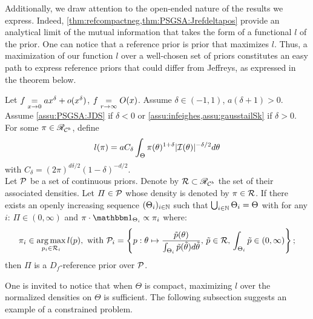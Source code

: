 Additionally, we draw attention to the open-ended nature of the results we express. 
Indeed, \cref{thm:refcompactneg,thm:PSGSA:Jrefdeltapos} provide an analytical limit of the mutual information that takes the form of a functional $l$ of the prior.
One can notice that a reference prior is prior that maximizes $l$.
Thus, a maximization of our function $l$ over a well-chosen set of priors constitutes an easy path to express reference priors that could differ from Jeffreys, as expressed in the theorem below.
\begin{thm}\label{thm:PSGSA:maximizel}
    Let $f\overset{}{\underset{x\rightarrow 0}{=}} a x^\delta+o(x^\delta)$, $f\overset{}{\underset{r\rightarrow\infty}{=}}O(x)$. Assume $\delta\in(-1,1)$, $a(\delta+1)>0$. Assume \cref{assu:PSGSA:JDS} if $\delta<0$ or \cref{assu:infeighes,assu:gausstailSk} if $\delta>0$.
    For some $\pi\in\mathscr{R}_{\mathcal{C}^b}$, define
        \begin{equation}
            l(\pi) = aC_\delta\int_\Theta\pi(\theta)^{1+\delta}|\mathcal{I}(\theta)|^{-\delta/2}d\theta
        \end{equation}
    with $C_\delta=(2\pi)^{d\delta/2}(1-\delta)^{-d/2} $. \\
    Let $\mathcal{P}$ be a set of continuous priors. %
    Denote by $\mathcal{R}\subset\mathscr{R}_{\mathcal{C}^b}$ the set of their associated densities.
    Let $\varPi\in\mathcal{P}$ whose density is denoted by $\pi\in\mathcal{R}$.
    If there exists an openly increasing sequence $(\Theta_i)_{i\in\mathbb{N}}$ such that $\bigcup_{i\in\mathbb{N}}\Theta_i=\Theta$ with for any $i$: $\varPi\in(0,\infty)$ and $\pi\cdot\indic_{\Theta_i}\propto\pi_i$ where:
        \begin{equation}\label{eq:PSGSA:piiargmaxl}
            \pi_i\in \argmax_{p_i\in\cR_i} l(p) ,\text{\ with\ }\cP_i=\left\{p:\theta\mapsto\frac{\tilde p(\theta)}{\int_{\Theta_i}\tilde p(\tilde\theta)d\tilde\theta },\,   \tilde p\in\cR,\, \int_{\Theta_i}\tilde p\in(0,\infty)    \right\};
        \end{equation}
    then $\varPi$ is a $D_f$-reference prior over $\mathcal{P}$.
\end{thm}

One is invited to notice that when $\Theta$ is compact, maximizing $l$ over the normalized densities on $\Theta$ is sufficient.
The following subsection suggests an example of a constrained problem.




